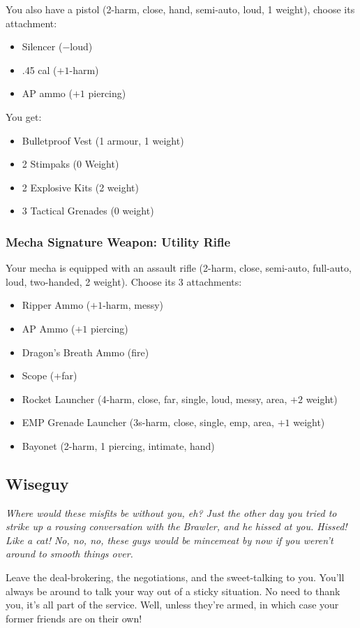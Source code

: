 You also have a pistol (2-harm, close, hand, semi-auto, loud, 1 weight), choose its attachment:
\begin{itemize}
\item Silencer ($-$loud)
\item .45 cal ($+1$-harm)
\item AP ammo ($+1$ piercing)
\end{itemize}

You get:
\begin{itemize}
\item Bulletproof Vest (1 armour, 1 weight)
\item 2 Stimpaks (0 Weight)
\item 2 Explosive Kits (2 weight)
\item 3 Tactical Grenades (0 weight)
\end{itemize}

\subsubsection{Mecha Signature Weapon: Utility Rifle}
Your mecha is equipped with an assault rifle (2-harm, close, semi-auto, full-auto, loud, two-handed, 2 weight). Choose its 3 attachments:
\begin{itemize}
\item Ripper Ammo ($+1$-harm, messy)
\item AP Ammo ($+1$ piercing)
\item Dragon's Breath Ammo (fire)
\item Scope (+far)
\item Rocket Launcher (4-harm, close, far, single, loud, messy, area, $+2$ weight)
\item EMP Grenade Launcher (3s-harm, close, single, emp, area, $+1$ weight)
\item Bayonet (2-harm, 1 piercing, intimate, hand)
\end{itemize}




\subsection{Wiseguy}
{\itshape Where would these misfits be without you, eh? Just the other
  day you tried to strike up a rousing conversation with the Brawler,
  and he \emph{hissed} at you. Hissed! Like a cat! No, no, no, these
  guys would be mincemeat by now if you weren't around to smooth
  things over.

Leave the deal-brokering, the negotiations, and the sweet-talking to
you. You'll always be around to talk your way out of a sticky
situation. No need to thank you, it's all part of the service. Well,
unless they're armed, in which case your former friends are on their
own!}
